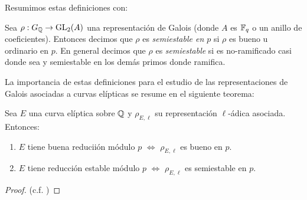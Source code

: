 Resumimos estas definiciones con:

\begin{defin}
  Sea $\rho:G_{\mathbb{Q}}\rightarrow\mathrm{GL}_2(A)$ una representaci\'on de Galois (donde $A$ es $\mathbb{F}_q$ o un anillo de
  coeficientes). Entonces decimos que $\rho$ es \emph{semiestable en $p$} si $\rho$ es bueno u
  ordinario en $p$. En general decimos que $\rho$ es \emph{semiestable} si es no-ramificado casi donde
  sea y semiestable en los dem\'as primos donde ramifica.
\end{defin}

La importancia de estas definiciones para el estudio de las representaciones de Galois asociadas
a curvas el\'ipticas se resume en el siguiente teorema:

\begin{thm}
  Sea $E$ una curva el\'iptica sobre $\mathbb{Q}$ y $\rho_{E,\ell}$ su representaci\'on $\ell$-\'adica
  asociada. Entonces:
  \begin{enumerate}
  \item $E$ tiene buena reducii\'on m\'odulo $p$ $\iff$ $\rho_{E,\ell}$ es bueno en $p$.
  \item $E$ tiene reducci\'on estable m\'odulo $p$ $\iff$ $\rho_{E,\ell}$ es semiestable en $p$.
  \end{enumerate}
\end{thm}

\begin{proof}
  (c.f. \cite[\S3.7, proposici\'on 3.46]{SaitoFLTBT})
\end{proof}
